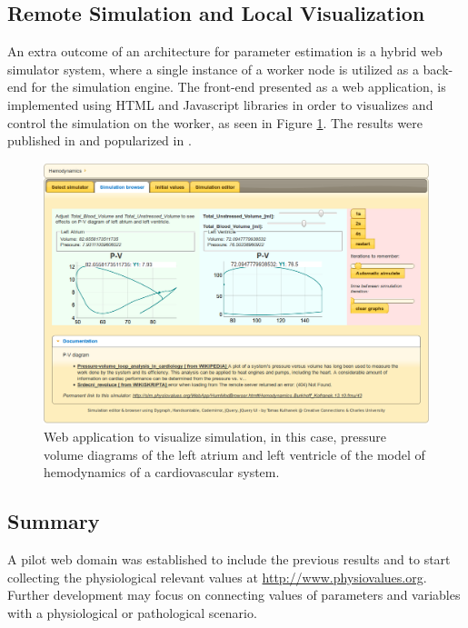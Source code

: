 \subsection{Remote Simulation and Local Visualization}
An extra outcome of an architecture for parameter estimation is a hybrid web simulator system, where a single instance of a worker node is utilized as a back-end for the simulation engine. The front-end presented as a web application, is implemented using HTML and Javascript libraries in order to visualizes and control the simulation on the worker, as seen in Figure \ref{fig:sim.physiovalues}.
The results were published in \cite{Kulhanek2013c} and popularized in \cite{Kulhanek2013b}.

\begin{figure}[htb]
    \centering
    \includegraphics[width=1\textwidth]{chapter7/sim-physiovalues.png}
    \caption{Web application to visualize simulation, in this case, pressure volume diagrams of the left atrium and left ventricle of the model of hemodynamics of a cardiovascular system.}
    \label{fig:sim.physiovalues}
\end{figure}

\subsection{Summary}

A pilot web domain was established to include the previous results and to start collecting the physiological relevant values at \url{http://www.physiovalues.org}. 
Further development may focus on connecting values of parameters and variables with a physiological or pathological scenario. 